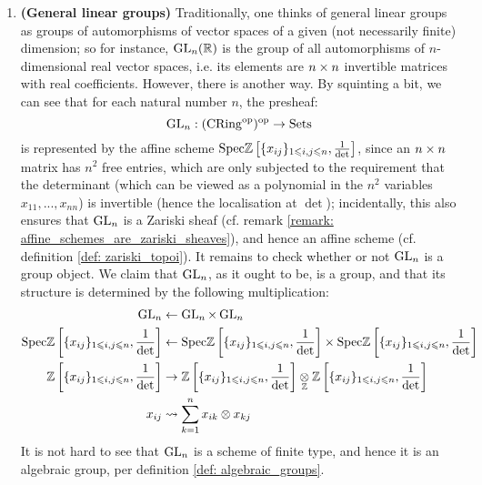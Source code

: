                 \begin{example}
                    \noindent
                    \begin{enumerate}
                        \item \textbf{(General linear groups)} Traditionally, one thinks of general linear groups as groups of automorphisms of vector spaces of a given (not necessarily finite) dimension; so for instance, $\operatorname{GL}_n(\mathbb{R})$ is the group of all automorphisms of $n$-dimensional real vector spaces, i.e. its elements are $n \x n$ invertible matrices with real coefficients. However, there is another way. By squinting a bit, we can see that for each natural number $n$, the presheaf:
                            $$\operatorname{GL}_n: (\mathrm{CRing}^{\mathrm{op}})^{\mathrm{op}} \to \mathrm{Sets}$$
                        is represented by the affine scheme $\mathrm{Spec} \mathbb{Z}\left[\{x_{ij}\}_{1 \leqslant i, j \leqslant n}, \frac{1}{\det}\right]$, since an $n \x n$ matrix has $n^2$ free entries, which are only subjected to the requirement that the determinant (which can be viewed as a polynomial in the $n^2$ variables $x_{11}, ..., x_{nn}$) is invertible (hence the localisation at $\det$); incidentally, this also ensures that $\operatorname{GL}_n$ is a Zariski sheaf (cf. remark \ref{remark: affine_schemes_are_zariski_sheaves}), and hence an affine scheme (cf. definition \ref{def: zariski_topoi}). It remains to check whether or not $\operatorname{GL}_n$ is a group object. We claim that $\operatorname{GL}_n$, as it ought to be, is a group, and that its structure is determined by the following multiplication:
                            $$
                                \begin{aligned}
                                    \GL_n & \leftarrow \GL_n \x \GL_n
                                    \\
                                    \Spec \Z\left[\{x_{ij}\}_{1 \leq i, j \leq n}, \frac{1}{\det}\right] & \leftarrow \Spec \Z\left[\{x_{ij}\}_{1 \leq i, j \leq n}, \frac{1}{\det}\right] \x \Spec \Z\left[\{x_{ij}\}_{1 \leq i, j \leq n}, \frac{1}{\det}\right]
                                    \\
                                    \Z\left[\{x_{ij}\}_{1 \leq i, j \leq n}, \frac{1}{\det}\right] & \to \Z\left[\{x_{ij}\}_{1 \leq i, j \leq n}, \frac{1}{\det}\right] \tensor_{\Z} \Z\left[\{x_{ij}\}_{1 \leq i, j \leq n}, \frac{1}{\det}\right]
                                    \\
                                    x_{ij} & \mapsto \sum_{k=1}^n x_{ik} \tensor x_{kj}
                                \end{aligned}
                            $$
                        It is not hard to see that $\operatorname{GL}_n$ is a scheme of finite type, and hence it is an algebraic group, per definition \ref{def: algebraic_groups}.
                        

\end{enumerate}
\end{example}
